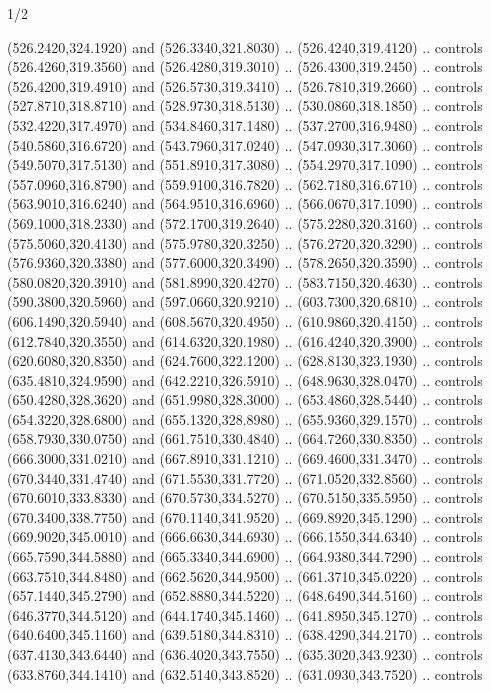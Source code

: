 \begin{flagdescription}{1/2}
\begin{scope}[xshift=0.5\flaglength,yshift=0.5\flagwidth,scale=\flagwidth/759]
\begin{scope}[y=0.8pt, x=0.8pt, yscale=-1,shift={(-720,-480)}]
\begin{scope}[cm={{1.14637,0.0,0.0,1.17117,(33.17849,82.1384)}}]
  (526.2420,324.1920) and (526.3340,321.8030) .. (526.4240,319.4120) .. controls
  (526.4260,319.3560) and (526.4280,319.3010) .. (526.4300,319.2450) .. controls
  (526.4200,319.4910) and (526.5730,319.3410) .. (526.7810,319.2660) .. controls
  (527.8710,318.8710) and (528.9730,318.5130) .. (530.0860,318.1850) .. controls
  (532.4220,317.4970) and (534.8460,317.1480) .. (537.2700,316.9480) .. controls
  (540.5860,316.6720) and (543.7960,317.0240) .. (547.0930,317.3060) .. controls
  (549.5070,317.5130) and (551.8910,317.3080) .. (554.2970,317.1090) .. controls
  (557.0960,316.8790) and (559.9100,316.7820) .. (562.7180,316.6710) .. controls
  (563.9010,316.6240) and (564.9510,316.6960) .. (566.0670,317.1090) .. controls
  (569.1000,318.2330) and (572.1700,319.2640) .. (575.2280,320.3160) .. controls
  (575.5060,320.4130) and (575.9780,320.3250) .. (576.2720,320.3290) .. controls
  (576.9360,320.3380) and (577.6000,320.3490) .. (578.2650,320.3590) .. controls
  (580.0820,320.3910) and (581.8990,320.4270) .. (583.7150,320.4630) .. controls
  (590.3800,320.5960) and (597.0660,320.9210) .. (603.7300,320.6810) .. controls
  (606.1490,320.5940) and (608.5670,320.4950) .. (610.9860,320.4150) .. controls
  (612.7840,320.3550) and (614.6320,320.1980) .. (616.4240,320.3900) .. controls
  (620.6080,320.8350) and (624.7600,322.1200) .. (628.8130,323.1930) .. controls
  (635.4810,324.9590) and (642.2210,326.5910) .. (648.9630,328.0470) .. controls
  (650.4280,328.3620) and (651.9980,328.3000) .. (653.4860,328.5440) .. controls
  (654.3220,328.6800) and (655.1320,328.8980) .. (655.9360,329.1570) .. controls
  (658.7930,330.0750) and (661.7510,330.4840) .. (664.7260,330.8350) .. controls
  (666.3000,331.0210) and (667.8910,331.1210) .. (669.4600,331.3470) .. controls
  (670.3440,331.4740) and (671.5530,331.7720) .. (671.0520,332.8560) .. controls
  (670.6010,333.8330) and (670.5730,334.5270) .. (670.5150,335.5950) .. controls
  (670.3400,338.7750) and (670.1140,341.9520) .. (669.8920,345.1290) .. controls
  (669.9020,345.0010) and (666.6630,344.6930) .. (666.1550,344.6340) .. controls
  (665.7590,344.5880) and (665.3340,344.6900) .. (664.9380,344.7290) .. controls
  (663.7510,344.8480) and (662.5620,344.9500) .. (661.3710,345.0220) .. controls
  (657.1440,345.2790) and (652.8880,344.5220) .. (648.6490,344.5160) .. controls
  (646.3770,344.5120) and (644.1740,345.1460) .. (641.8950,345.1270) .. controls
  (640.6400,345.1160) and (639.5180,344.8310) .. (638.4290,344.2170) .. controls
  (637.4130,343.6440) and (636.4020,343.7550) .. (635.3020,343.9230) .. controls
  (633.8760,344.1410) and (632.5140,343.8520) .. (631.0930,343.7520) .. controls

\end{scope}
\end{scope}
\end{scope}
\end{flagdescription}
